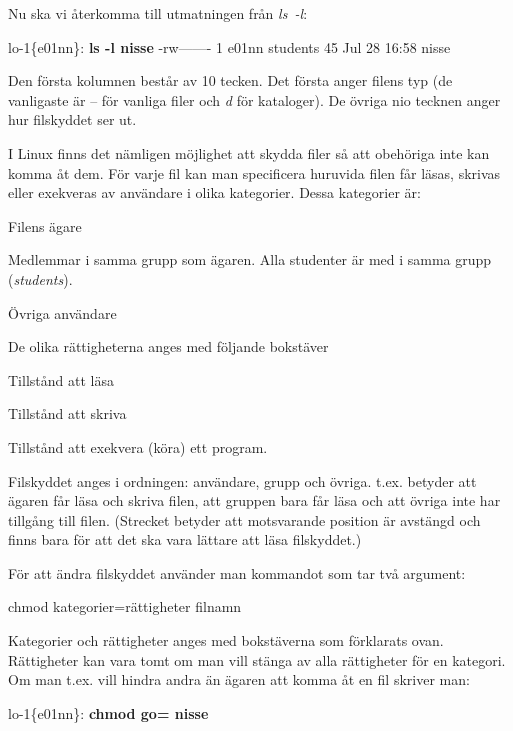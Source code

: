 \documentclass[a4paper,twocolumn]{book}
\begin{document}
\label{sec:filskydd}
Nu ska vi återkomma till utmatningen från \emph{ls~-l}:
\begin{example}
  \scriptsize
  lo-1\{e01nn\}: \textbf{ls -l nisse}
  -rw-------   1 e01nn  students  45  Jul 28 16:58 nisse
\end{example}
Den första kolumnen består av 10 tecken. Det första anger filens typ
(de vanligaste är -- för vanliga filer och \emph{d} för kataloger). De
övriga nio tecknen anger hur filskyddet ser ut.

I Linux finns det nämligen möjlighet att skydda filer så att
obehöriga inte kan komma åt dem. För varje fil kan man specificera
huruvida filen får läsas, skrivas eller exekveras av användare i olika
kategorier. Dessa kategorier är:
\begin{description}
  \samepage
  \item[u (user)] Filens ägare
  \item[g (group)] Medlemmar i samma grupp som ägaren. Alla studenter
    är med i samma grupp (\emph{students}).
  \item[o (others)] Övriga användare
\end{description}
De olika rättigheterna anges med följande bokstäver
\begin{description}
  \samepage
  \item[r (read)] Tillstånd att läsa
  \item[w (write)] Tillstånd att skriva
  \item[x (execute)] Tillstånd att exekvera (köra) ett program.
\end{description}

Filskyddet anges i ordningen: användare, grupp och övriga. t.ex.
betyder  att ägaren får läsa och skriva filen, att
gruppen bara får läsa och att övriga inte har tillgång till filen.
(Strecket betyder att motsvarande position är avstängd och finns bara
för att det ska vara lättare att läsa filskyddet.)

För att ändra filskyddet använder man kommandot  som
tar två argument:
\begin{ttquote}
  chmod kategorier=rättigheter filnamn
\end{ttquote}
Kategorier och rättigheter anges med bokstäverna som förklarats
ovan. Rättigheter kan vara tomt om man vill stänga av alla rättigheter
för en kategori. Om man t.ex. vill hindra andra än ägaren att komma åt
en fil skriver man:
\begin{example}
  lo-1\{e01nn\}: \textbf{chmod go= nisse}
\end{example}
\end{document}
